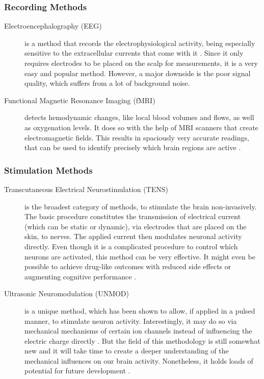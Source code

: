         \subsubsection{Recording Methods}
        \begin{description}
            \item[Electroencephalography (EEG)] is a method that records the electrophysiological activity, being especially sensitive to the extracellular currents that come with it \cite{Baillet.2001}. Since it only requires electrodes to be placed on the scalp for measurements, it is a very easy and popular method. However, a major downside is the poor signal quality, which suffers from a lot of background noise.
            \item[Functional Magnetic Resonance Imaging (fMRI)] detects hemodynamic changes, like local blood volumes and flows, as well as oxygenation levels. It does so with the help of MRI scanners that create electromagnetic fields. This results in spaciously very accurate readings, that can be used to identify precisely which brain regions are active \cite{deCharms.2004}.
        \end{description}

        \subsubsection{Stimulation Methods}
        \begin{description}
            \item[Transcutaneous Electrical Neurostimulation (TENS)] is the broadest category of methods, to stimulate the brain non-invasively. The basic procedure constitutes the transmission of electrical current (which can be static or dynamic), via electrodes that are placed on the skin, to nerves. The applied current then modulates neuronal activity directly. Even though it is a complicated procedure to control which neurons are activated, this method can be very effective. It might even be possible to achieve drug-like outcomes with reduced side effects or augmenting cognitive performance \cite{WilliamJ.Tyler.2017}. 
            \item[Ultrasonic Neuromodulation (UNMOD)] is a unique method, which has been shown to allow, if applied in a pulsed manner, to stimulate neuron activity. Interestingly, it may do so via mechanical mechanisms of certain ion channels instead of influencing the electric charge directly \cite{Tyler.2008}. But the field of this methodology is still somewhat new and it will take time to create a deeper understanding of the mechanical influences on our brain activity. Nonetheless, it holds loads of potential for future development \cite{WilliamJ.Tyler.2017}.
        \end{description}


